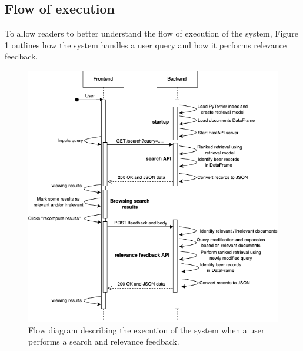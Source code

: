 \newpage
\subsection{Flow of execution}

To allow readers to better understand the flow of execution of the system, Figure \ref{fig:flow-diagram} outlines how the system handles a user query and how it performs relevance feedback.

\begin{figure}[H]
  \centering
  \includegraphics[width=1\textwidth]{img/3_implementation/search-flow.png}
  \caption{Flow diagram describing the execution of the system when a user performs a search and relevance feedback.}
  \label{fig:flow-diagram}
\end{figure}
\newpage
